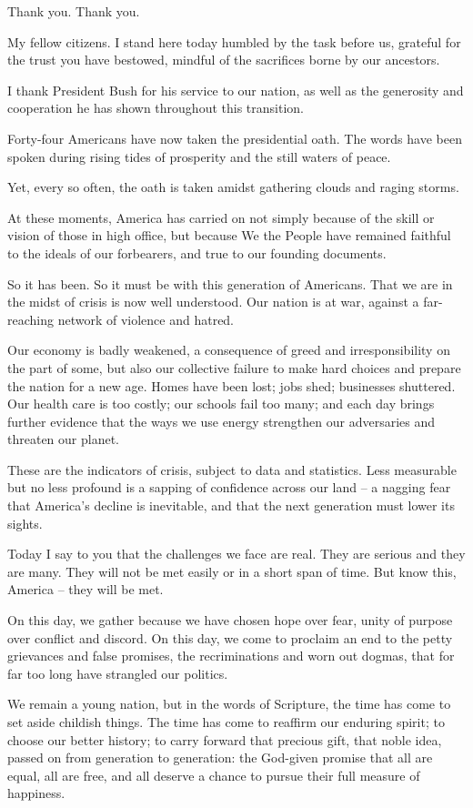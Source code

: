 Thank you. Thank you.

My fellow citizens. I stand here today humbled by the task before us, grateful for the trust you have bestowed, mindful of the sacrifices borne by our ancestors.

I thank President Bush for his service to our nation, as well as the generosity and cooperation he has shown throughout this transition.

Forty-four Americans have now taken the presidential oath. The words have been spoken during rising tides of prosperity and the still waters of peace.


Yet, every so often, the oath is taken amidst gathering clouds and raging storms.

At these moments, America has carried on not simply because of the skill or vision of those in high office, but because We the People have remained 
faithful to the ideals of our forbearers, and true to our founding documents.

So it has been. So it must be with this generation of Americans. That we are in the midst of crisis is now well understood. Our nation is at war, against 
a far-reaching network of violence and hatred.

Our economy is badly weakened, a consequence of greed and irresponsibility on the part of some, but also our collective failure to make hard choices 
and prepare the nation for a new age. Homes have been lost; jobs shed; businesses shuttered. Our health care is too costly; our schools fail too many; 
and each day brings further evidence that the ways we use energy strengthen our adversaries and threaten our planet.


These are the indicators of crisis, subject to data and statistics. Less measurable but no less profound is a sapping of confidence across our land – a 
nagging fear that America’s decline is inevitable, and that the next generation must lower its sights.

Today I say to you that the challenges we face are real. They are serious and they are many. They will not be met easily or in a short span of time. But 
know this, America – they will be met.

On this day, we gather because we have chosen hope over fear, unity of purpose over conflict and discord. On this day, we come to proclaim an end to 
the petty grievances and false promises, the recriminations and worn out dogmas, that for far too long have strangled our politics.

We remain a young nation, but in the words of Scripture, the time has come to set aside childish things. The time has come to reaffirm our enduring spirit; 
to choose our better history; to carry forward that precious gift, that noble idea, passed on from generation to generation: the God-given promise that all 
are equal, all are free, and all deserve a chance to pursue their full measure of happiness.


